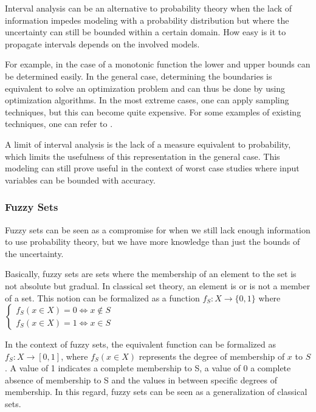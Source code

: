 Interval analysis can be an alternative to probability theory when the lack of information impedes modeling with a probability distribution but where the uncertainty can still be bounded within a certain domain.
How easy is it to propagate intervals depends on the involved models.

For example, in the case of a monotonic function the lower and upper bounds can be determined easily. In the general case, determining the boundaries is equivalent to solve an optimization problem and can thus be done by using optimization algorithms. In the most extreme cases, one can apply sampling techniques, but this can become quite expensive.
For some examples of existing techniques, one can refer to \cite{Kreinovich_2008}.

A limit of interval analysis is the lack of a measure equivalent to probability, which limits the usefulness of this representation in the general case. This modeling can still prove useful in the context of worst case studies where input variables can be bounded with accuracy.

\subsubsection{Fuzzy Sets}

Fuzzy sets \cite{zadeh1965fuzzy} can be seen as a compromise for when we still lack enough information to use probability theory, but we have more knowledge than just the bounds of the uncertainty.

Basically, fuzzy sets are sets where the membership of an element to the set is not absolute but gradual.
In classical set theory, an element is or is not a member of a set. This notion can be formalized as a function $f_S: X \rightarrow \{0,1\}$ where 
$\left\{
 		 \begin{array}{rcr}
			f_S(x \in X) = 0 \Leftrightarrow x \not\in S\\
			f_S(x\in X) = 1 \Leftrightarrow x \in S
		\end{array}
	\right. $

In the context of fuzzy sets, the equivalent function can be formalized as $f_S: X \rightarrow [0, 1]$, where $f_S(x \in X)$ represents the degree of membership of $x$ to $S$. A value of 1 indicates a complete membership to S, a value of 0 a complete absence of membership to S and the values in between specific degrees of membership.
In this regard, fuzzy sets can be seen as a generalization of classical sets.

